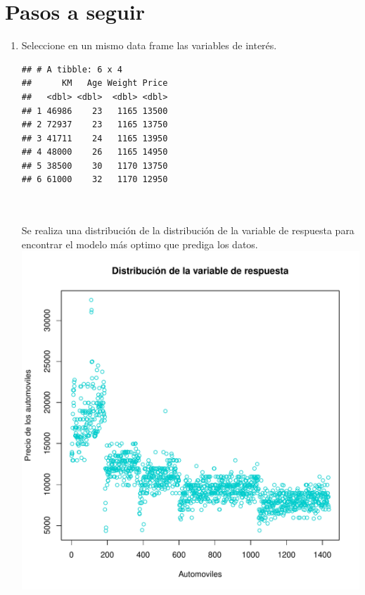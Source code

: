 \documentclass[11pt,letterpaper]{article}\usepackage[]{graphicx}\usepackage[]{color}
\makeatletter
\def\maxwidth{ %
  \ifdim\Gin@nat@width>\linewidth
    \linewidth
  \else
    \Gin@nat@width
  \fi
}
\newenvironment{kframe}{%
 \def\at@end@of@kframe{}%
 \ifinner\ifhmode%
  \def\at@end@of@kframe{\end{minipage}}%
  \begin{minipage}{\columnwidth}%
 \fi\fi%
 \def\FrameCommand##1{\hskip\@totalleftmargin \hskip-\fboxsep
 \colorbox{shadecolor}{##1}\hskip-\fboxsep
     \hskip-\linewidth \hskip-\@totalleftmargin \hskip\columnwidth}%
 \MakeFramed {\advance\hsize-\width
   \@totalleftmargin\z@ \linewidth\hsize
   \@setminipage}}%
 {\par\unskip\endMakeFramed%
 \at@end@of@kframe}
\newenvironment{knitrout}{}{} %
\makeatother
\begin{document}
\section*{\textbf{Pasos a seguir}}
\begin{enumerate}
    \item Seleccione en un mismo data frame las variables de interés.


\begin{knitrout}
\color{fgcolor}\begin{kframe}
\begin{verbatim}
## # A tibble: 6 x 4
##      KM   Age Weight Price
##   <dbl> <dbl>  <dbl> <dbl>
## 1 46986    23   1165 13500
## 2 72937    23   1165 13750
## 3 41711    24   1165 13950
## 4 48000    26   1165 14950
## 5 38500    30   1170 13750
## 6 61000    32   1170 12950
\end{verbatim}
\end{kframe}
\end{knitrout}

\\ \\
Se realiza una distribución de la distribución de la variable de respuesta para encontrar el modelo más optimo que prediga los datos.
\begin{knitrout}
\color{fgcolor}
\includegraphics[width=\maxwidth]{figure/unnamed-chunk-3-1} 


\end{knitrout}
\end{enumerate}
\end{document}
